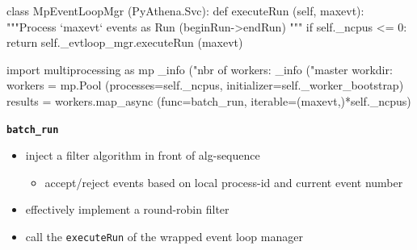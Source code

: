\documentclass[9pt]{beamer}
\newcommand{\mypurple}[1]{{\color[rgb]{0.7,0,0.8}#1}}
\newcommand{\myred}  [1] {{\color{red}#1}}
\begin{document}
\begin{frame}[fragile]{}

  \begin{columns}
    \begin{column}{0.95\textwidth}

\begin{python}
class MpEventLoopMgr (PyAthena.Svc):
    def executeRun (self, maxevt):
        """Process `maxevt` events as Run (beginRun->endRun)
        """
        if self._ncpus <= 0:
            return self._evtloop_mgr.executeRun (maxevt)

        import multiprocessing as mp
        _info ("nbr of workers: %
        _info ("master workdir: %
        workers = mp.Pool (processes=self._ncpus,
                           initializer=self._worker_bootstrap)
        results = workers.map_async (func=batch_run,
                                     iterable=(maxevt,)*self._ncpus)
\end{python}

\begin{block}{\bf{\mypurple{\texttt{batch\_run}}}}
\begin{itemize}
  \item inject a filter algorithm in front of alg-sequence
    \begin{itemize}
      \item accept/reject events based on local process-id and current event number
    \end{itemize}
  \item effectively implement a round-robin filter
  \item call the \myred{\texttt{executeRun}} of the wrapped event loop manager
\end{itemize}
\end{block}
    \end{column}
  \end{columns}
\end{frame}
\end{document}
